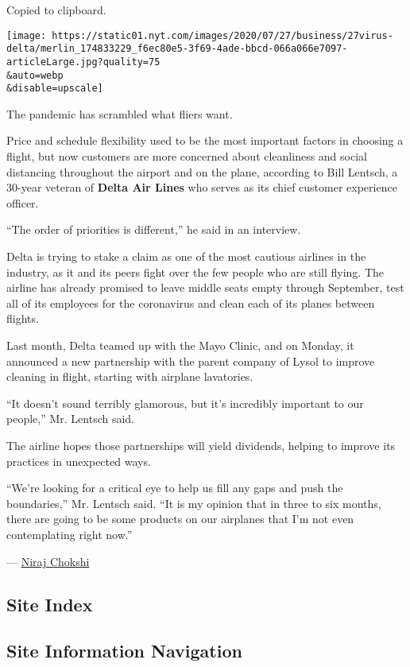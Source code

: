 Copied to clipboard.

\texttt{[image: https://static01.nyt.com/images/2020/07/27/business/27virus-delta/merlin\_174833229\_f6ec80e5-3f69-4ade-bbcd-066a066e7097-articleLarge.jpg?quality=75\\\&auto=webp\\\&disable=upscale]}

The pandemic has scrambled what fliers want.

Price and schedule flexibility used to be the most important factors in
choosing a flight, but now customers are more concerned about
cleanliness and social distancing throughout the airport and on the
plane, according to Bill Lentsch, a 30-year veteran of \textbf{Delta Air
Lines} who serves as its chief customer experience officer.

``The order of priorities is different,'' he said in an interview.

Delta is trying to stake a claim as one of the most cautious airlines in
the industry, as it and its peers fight over the few people who are
still flying. The airline has already promised to leave middle seats
empty through September, test all of its employees for the coronavirus
and clean each of its planes between flights.

Last month, Delta teamed up with the Mayo Clinic, and on Monday, it
announced a new partnership with the parent company of Lysol to improve
cleaning in flight, starting with airplane lavatories.

``It doesn't sound terribly glamorous, but it's incredibly important to
our people,'' Mr. Lentsch said.

The airline hopes those partnerships will yield dividends, helping to
improve its practices in unexpected ways.

``We're looking for a critical eye to help us fill any gaps and push the
boundaries,'' Mr. Lentsch said. ``It is my opinion that in three to six
months, there are going to be some products on our airplanes that I'm
not even contemplating right now.''

--- \href{https://www.nytimes.com/by/niraj-chokshi}{Niraj Chokshi}

\hypertarget{site-index}{%
\subsection{Site Index}\label{site-index}}

\hypertarget{site-information-navigation}{%
\subsection{Site Information
Navigation}\label{site-information-navigation}}

